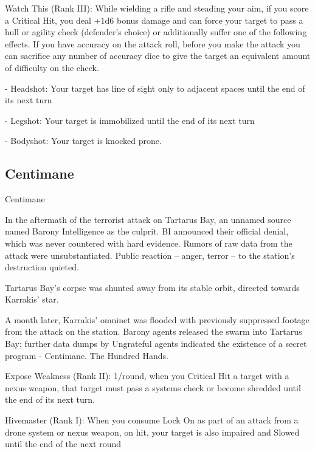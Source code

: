 Watch This (Rank III): While wielding a rifle and steading your aim, if you score a Critical Hit, you   
deal +1d6 bonus damage and can force your target to pass a hull or agility check (defender’s  
choice) or additionally suffer one of the following effects. If you have accuracy on the attack roll,  
before you make the attack you can sacrifice any number of accuracy dice to give the target an  
equivalent amount of difficulty on the check.
 
     -   Headshot: Your target has line of sight only to adjacent spaces until the end of its next  
         turn
 
     -   Legshot: Your target is immobilized until the end of its next turn
 
     -   Bodyshot: Your target is knocked prone.
 
\subsection{Centimane}

                                                   Centimane  

In the aftermath of the terrorist attack on Tartarus Bay, an unnamed source named Barony Intelligence as  
the culprit. BI announced their official denial, which was never countered with hard evidence. Rumors of raw  
data from the attack were unsubstantiated. Public reaction -- anger, terror -- to the station’s destruction  
quieted.   

 Tartarus Bay’s corpse was shunted away from its stable orbit, directed towards Karrakis’ star.   

A month later, Karrakis’ omninet was flooded with previously suppressed footage from the attack on the  
station. Barony agents released the swarm into Tartarus Bay; further data dumps by Ungrateful agents  
indicated the existence of a secret program - Centimane. The Hundred Hands.  

                                                                                                                     


Expose Weakness (Rank II): 1/round, when you Critical Hit a target with a nexus weapon, that  
target must pass a systems check or become shredded until the end of its next turn.
 
Hivemaster (Rank I): When you consume Lock On as part of an attack from a drone system or  
nexus weapon, on hit, your target is also impaired and Slowed until the end of the next round
 
